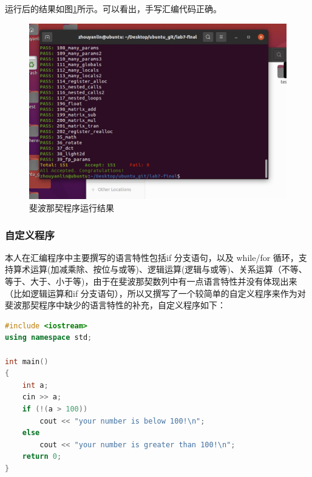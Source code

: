 \documentclass[UTF8,a4paper,10pt]{ctexart}
\begin{document}
运行后的结果如图\ref{fig:1}所示。可以看出，手写汇编代码正确。
\begin{figure}[H]
    \centering
    \includegraphics[scale=0.4]{1.png}
    \caption{斐波那契程序运行结果}
    \label{fig:1}
\end{figure}








\subsubsection{自定义程序}
本人在汇编程序中主要撰写的语言特性包括if 分支语句，以及 while/for 循环，支持算术运算(加减乘除、按位与或等)、逻辑运算(逻辑与或等)、关系运算（不等、等于、大于、小于等)，由于在斐波那契数列中有一点语言特性并没有体现出来（比如逻辑运算和if 分支语句），所以又撰写了一个较简单的自定义程序来作为对斐波那契程序中缺少的语言特性的补充，自定义程序如下：

\begin{lstlisting}[title = 自定义源程序, language = c++]
#include <iostream>
using namespace std;

int main()
{
    int a;
    cin >> a;
    if (!(a > 100))
        cout << "your number is below 100!\n";
    else
        cout << "your number is greater than 100!\n";
    return 0;
}
\end{lstlisting}
\end{document}
